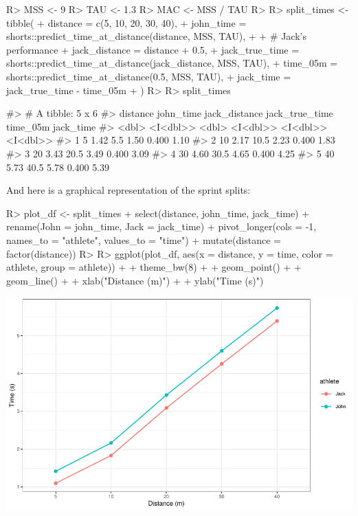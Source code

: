 \documentclass[
]{jss}
\begin{document}
\begin{CodeChunk}
\begin{CodeInput}
R> MSS <- 9
R> TAU <- 1.3
R> MAC <- MSS / TAU
R> 
R> split_times <- tibble(
+   distance = c(5, 10, 20, 30, 40),
+   john_time = shorts::predict_time_at_distance(distance, MSS, TAU),
+ 
+   # Jack's performance
+   jack_distance = distance + 0.5,
+   jack_true_time = shorts::predict_time_at_distance(jack_distance, MSS, TAU),
+   time_05m = shorts::predict_time_at_distance(0.5, MSS, TAU),
+   jack_time = jack_true_time - time_05m
+ )
R> 
R> split_times
\end{CodeInput}
\begin{CodeOutput}
#> # A tibble: 5 x 6
#>   distance john_time jack_distance jack_true_time time_05m jack_time
#>      <dbl>  <I<dbl>>         <dbl>       <I<dbl>> <I<dbl>>  <I<dbl>>
#> 1        5      1.42           5.5           1.50    0.400      1.10
#> 2       10      2.17          10.5           2.23    0.400      1.83
#> 3       20      3.43          20.5           3.49    0.400      3.09
#> 4       30      4.60          30.5           4.65    0.400      4.25
#> 5       40      5.73          40.5           5.78    0.400      5.39
\end{CodeOutput}
\end{CodeChunk}

And here is a graphical representation of the sprint splits:

\begin{CodeChunk}
\begin{CodeInput}
R> plot_df <- split_times %
+   select(distance, john_time, jack_time) %
+   rename(John = john_time, Jack = jack_time) %
+   pivot_longer(cols = -1, names_to = "athlete", values_to = "time") %
+   mutate(distance = factor(distance))
R> 
R> ggplot(plot_df, aes(x = distance, y = time, color = athlete, group = athlete)) +
+   theme_bw(8) +
+   geom_point() +
+   geom_line() +
+   xlab("Distance (m)") +
+   ylab("Time (s)")
\end{CodeInput}


\begin{center}\includegraphics[width=1\linewidth]{paper_files/figure-latex/unnamed-chunk-23-1} \end{center}

\end{CodeChunk}
\end{document}
